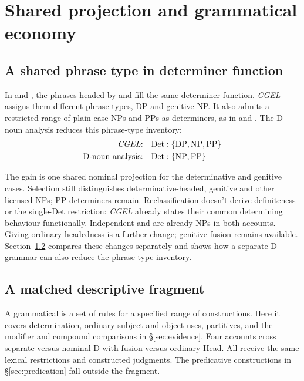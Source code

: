 \documentclass[12pt]{article}
\begin{document}
\section{Shared projection and grammatical economy}\label{sec:economy}

\subsection{A shared phrase type in determiner function}\label{sec:det-uniform}

In  and , the phrases headed by  and  fill the same determiner function. \textit{CGEL} assigns them different phrase types, DP and genitive NP. It also admits a restricted range of plain-case NPs and PPs as determiners, as in  and  \citep[Ch.~5, §4]{huddleston2002}. The D-noun analysis reduces this phrase-type inventory:
\[
\begin{aligned}
\text{\textit{CGEL}:} &\quad \mathrm{Det}:\{\mathrm{DP},\mathrm{NP},\mathrm{PP}\} \\
\text{D-noun analysis:} &\quad \mathrm{Det}:\{\mathrm{NP},\mathrm{PP}\}
\end{aligned}
\]

The gain is one shared nominal projection for the determinative and genitive cases. Selection still distinguishes determinative-headed, genitive and other licensed NPs; PP determiners remain. Reclassification doesn't derive definiteness or the single-Det restriction: \textit{CGEL} already states their common determining behaviour functionally. Independent  and  are already NPs in both accounts. Giving  ordinary headedness is a further change; genitive fusion remains available. Section~\ref{sec:fragment} compares these changes separately and shows how a separate-D grammar can also reduce the phrase-type inventory.

\subsection{A matched descriptive fragment}\label{sec:fragment}

A grammatical  is a set of rules for a specified range of constructions. Here it covers determination, ordinary subject and object uses, partitives, and the modifier and compound comparisons in §\ref{sec:evidence}. Four accounts cross separate versus nominal D with fusion versus ordinary Head. All receive the same lexical restrictions and constructed judgments. The predicative constructions in §\ref{sec:predication} fall outside the fragment.
\end{document}
